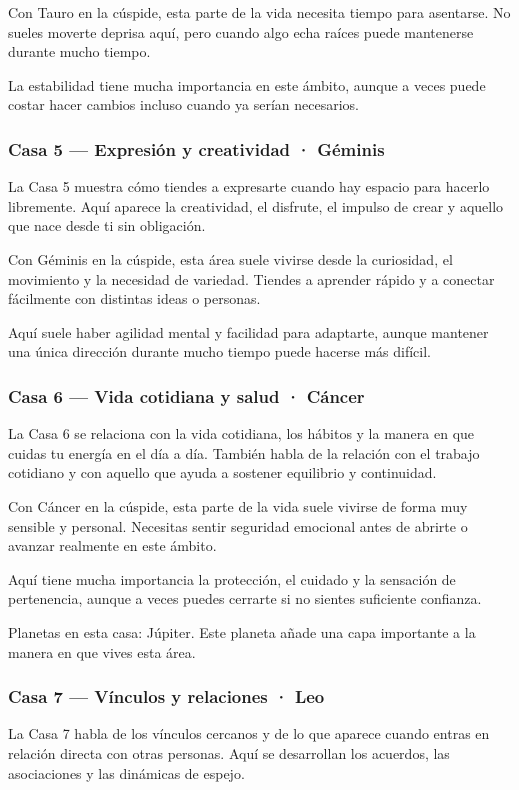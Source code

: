 \documentclass[11pt,a4paper]{article}
\begin{document}
Con Tauro en la cúspide, esta parte de la vida necesita tiempo para asentarse. No sueles moverte deprisa aquí, pero cuando algo echa raíces puede mantenerse durante mucho tiempo.

La estabilidad tiene mucha importancia en este ámbito, aunque a veces puede costar hacer cambios incluso cuando ya serían necesarios.

\subsubsection*{Casa 5 — Expresión y creatividad · Géminis}
La Casa 5 muestra cómo tiendes a expresarte cuando hay espacio para hacerlo libremente. Aquí aparece la creatividad, el disfrute, el impulso de crear y aquello que nace desde ti sin obligación.

Con Géminis en la cúspide, esta área suele vivirse desde la curiosidad, el movimiento y la necesidad de variedad. Tiendes a aprender rápido y a conectar fácilmente con distintas ideas o personas.

Aquí suele haber agilidad mental y facilidad para adaptarte, aunque mantener una única dirección durante mucho tiempo puede hacerse más difícil.

\subsubsection*{Casa 6 — Vida cotidiana y salud · Cáncer}
La Casa 6 se relaciona con la vida cotidiana, los hábitos y la manera en que cuidas tu energía en el día a día. También habla de la relación con el trabajo cotidiano y con aquello que ayuda a sostener equilibrio y continuidad.

Con Cáncer en la cúspide, esta parte de la vida suele vivirse de forma muy sensible y personal. Necesitas sentir seguridad emocional antes de abrirte o avanzar realmente en este ámbito.

Aquí tiene mucha importancia la protección, el cuidado y la sensación de pertenencia, aunque a veces puedes cerrarte si no sientes suficiente confianza.

Planetas en esta casa: Júpiter. Este planeta añade una capa importante a la manera en que vives esta área.

\subsubsection*{Casa 7 — Vínculos y relaciones · Leo}
La Casa 7 habla de los vínculos cercanos y de lo que aparece cuando entras en relación directa con otras personas. Aquí se desarrollan los acuerdos, las asociaciones y las dinámicas de espejo.
\end{document}
